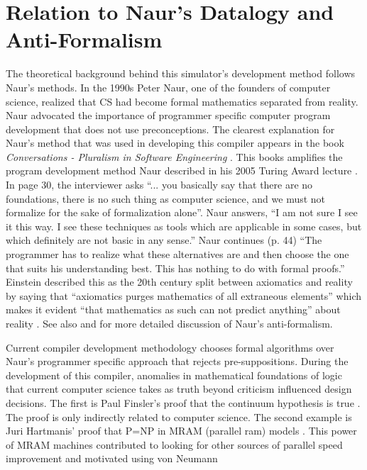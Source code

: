 \documentclass[preprint, authoryear]{sigplanconf}
\begin{document}
\section{Relation to Naur's Datalogy and Anti-Formalism}
\par
The theoretical background behind this simulator's development method
follows Naur's methods.  In the 1990s Peter Naur, one of the founders
of computer science, realized that CS had become formal mathematics separated
from reality.  Naur advocated the importance of programmer specific
computer program development that does not use preconceptions.  The clearest
explanation for Naur's method that was used in developing this compiler
appears in the book \textit{Conversations - Pluralism in Software
Engineering} \cite{Naur2011}.
This books amplifies the program development method Naur described
in his 2005 Turing Award lecture \cite{Naur2007}.
In \cite{Naur2011} page 30, the interviewer asks ``... you basically say
that there are no foundations, there is no such thing as computer science,
and we must not formalize for the sake of formalization alone''.
Naur answers, ``I am not sure I see it this way.  I see these techniques
as tools which are applicable in some cases, but which definitely are
not basic in any sense.''
Naur continues (p. 44) ``The programmer has to realize what these alternatives
are and then choose the one that suits his understanding best.
This has nothing to do with formal proofs.''
Einstein described this as the 20th century split between axiomatics
and reality by saying that ``axiomatics purges mathematics of all
extraneous elements'' which makes it evident ``that mathematics as
such can not predict anything'' about reality \cite{Einstein1921}.
See also \cite{Naur2005} and \cite{Meyer2013}
for more detailed discussion of Naur's anti-formalism.
\par
Current compiler development methodology chooses formal algorithms
over Naur's programmer specific approach that rejects pre-suppositions.  During the development of this compiler, anomalies in mathematical
foundations of logic that current computer science takes as truth beyond
criticism influenced design decisions. 
The first is Paul Finsler's proof that the continuum
hypothesis is true \cite{Finsler1969}.  The proof is only indirectly
related to computer science.
The second example is Juri Hartmanis' proof that P=NP in MRAM (parallel
ram) models \cite{Hartmanis1976}.
This power of MRAM machines contributed to looking for other sources of
parallel speed improvement and motivated using von Neumann
\end{document}

